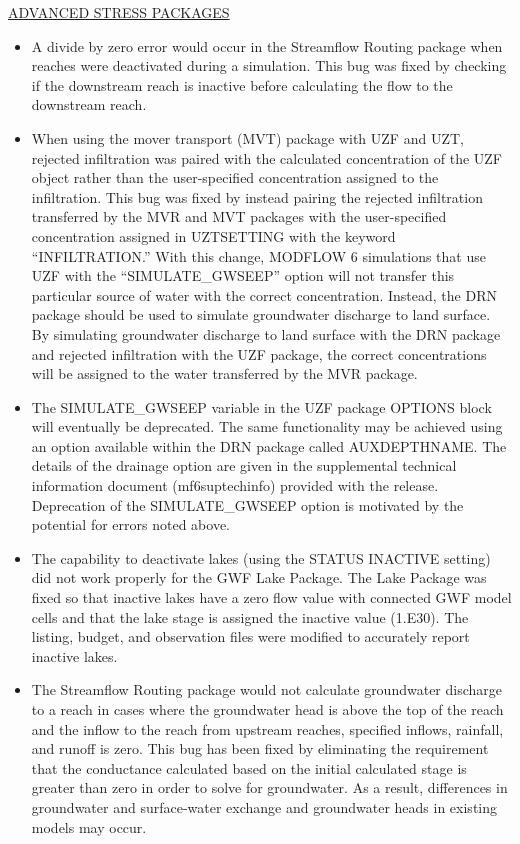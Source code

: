 	\underline{ADVANCED STRESS PACKAGES}
	\begin{itemize}
		\item A divide by zero error would occur in the Streamflow Routing package when reaches were deactivated during a simulation. This bug was fixed by checking if the downstream reach is inactive before calculating the flow to the downstream reach.
		\item When using the mover transport (MVT) package with UZF and UZT, rejected infiltration was paired with the calculated concentration of the UZF object rather than the user-specified concentration assigned to the infiltration.  This bug was fixed by instead pairing the rejected infiltration transferred by the MVR and MVT packages with the user-specified concentration assigned in UZTSETTING with the keyword ``INFILTRATION.''  With this change, MODFLOW 6 simulations that use UZF with the ``SIMULATE\_GWSEEP'' option will not transfer this particular source of water with the correct concentration.  Instead, the DRN package should be used to simulate groundwater discharge to land surface.  By simulating groundwater discharge to land surface with the DRN package and rejected infiltration with the UZF package, the correct concentrations will be assigned to the water transferred by the MVR package.
		\item The SIMULATE\_GWSEEP variable in the UZF package OPTIONS block will eventually be deprecated.  The same functionality may be achieved using an option available within the DRN package called AUXDEPTHNAME.  The details of the drainage option are given in the supplemental technical information document (mf6suptechinfo) provided with the release.  Deprecation of the SIMULATE\_GWSEEP option is motivated by the potential for errors noted above.
		\item The capability to deactivate lakes (using the STATUS INACTIVE setting) did not work properly for the GWF Lake Package.  The Lake Package was fixed so that inactive lakes have a zero flow value with connected GWF model cells and that the lake stage is assigned the inactive value (1.E30).  The listing, budget, and observation files were modified to accurately report inactive lakes.
		\item The Streamflow Routing package would not calculate groundwater discharge to a reach in cases where the groundwater head is above the top of the reach and the inflow to the reach from upstream reaches, specified inflows, rainfall, and runoff is zero. This bug has been fixed by eliminating the requirement that the conductance calculated based on the initial calculated stage is greater than zero in order to solve for groundwater. As a result, differences in groundwater and surface-water exchange and groundwater heads in existing models may occur.  

\end{itemize}
